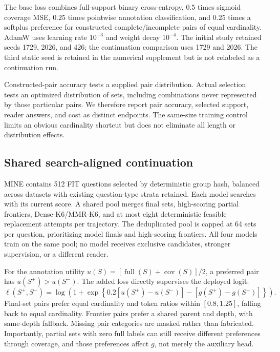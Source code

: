 \documentclass[preprint,12pt]{elsarticle}
\newcommand{\cov}{\operatorname{cov}}
\newcommand{\full}{\operatorname{full}}
\begin{document}
The base loss combines full-support binary cross-entropy, $0.5$ times sigmoid coverage MSE, $0.25$ times pointwise annotation classification, and $0.25$ times a softplus preference for constructed complete/incomplete pairs of equal cardinality. AdamW uses learning rate $10^{-3}$ and weight decay $10^{-4}$. The initial study retained seeds 1729, 2026, and 426; the continuation comparison uses 1729 and 2026. The third static seed is retained in the numerical supplement but is not relabeled as a continuation run.

Constructed-pair accuracy tests a supplied pair distribution. Actual selection tests an optimized distribution of sets, including combinations never represented by those particular pairs. We therefore report pair accuracy, selected support, reader answers, and cost as distinct endpoints. The same-size training control limits an obvious cardinality shortcut but does not eliminate all length or distribution effects.

\subsection{Shared search-aligned continuation}
MINE contains 512 FIT questions selected by deterministic group hash, balanced across datasets with existing question-type strata retained. Each model searches with its current score. A shared pool merges final sets, high-scoring partial frontiers, Dense-K6/MMR-K6, and at most eight deterministic feasible replacement attempts per trajectory. The deduplicated pool is capped at 64 sets per question, prioritizing model finals and high-scoring frontiers. All four models train on the same pool; no model receives exclusive candidates, stronger supervision, or a different reader.

For the annotation utility $u(S)=[\full(S)+\cov(S)]/2$, a preferred pair has $u(S^+)>u(S^-)$. The added loss directly supervises the deployed logit:
\begin{equation}\label{eq:pref}
\ell(S^+,S^-)=\log\left(1+\exp\left\{0.2[u(S^+)-u(S^-)]-[g(S^+)-g(S^-)]\right\}\right).
\end{equation}
Final-set pairs prefer equal cardinality and token ratios within $[0.8,1.25]$, falling back to equal cardinality. Frontier pairs prefer a shared parent and depth, with same-depth fallback. Missing pair categories are masked rather than fabricated. Importantly, partial sets with zero full labels can still receive different preferences through coverage, and those preferences affect $g$, not merely the auxiliary head.
\end{document}
